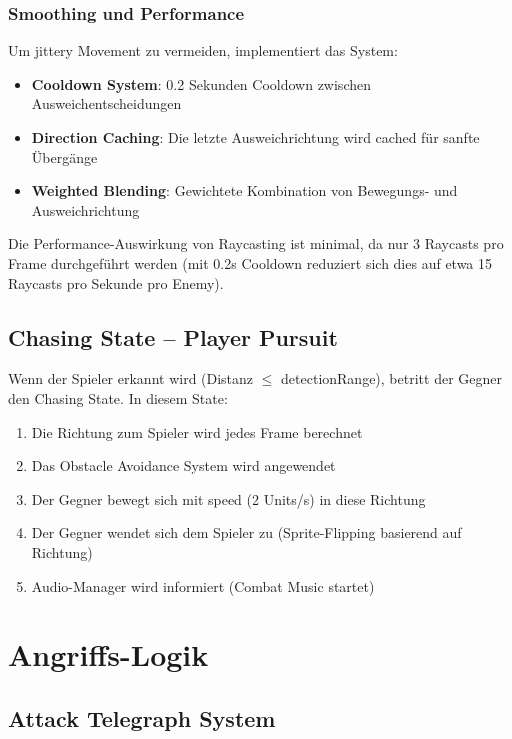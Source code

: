\documentclass[
  a4paper,
  11pt,
  ngerman,
  parskip=half,
  bibliography=totoc,
  listof=totoc
]{scrreprt}
\begin{document}
\subsubsection{Smoothing und Performance}

Um jittery Movement zu vermeiden, implementiert das System:

\begin{itemize}
    \item \textbf{Cooldown System}: 0.2 Sekunden Cooldown zwischen Ausweichentscheidungen
    \item \textbf{Direction Caching}: Die letzte Ausweichrichtung wird cached für sanfte Übergänge
    \item \textbf{Weighted Blending}: Gewichtete Kombination von Bewegungs- und Ausweichrichtung
\end{itemize}

Die Performance-Auswirkung von Raycasting ist minimal, da nur 3 Raycasts pro Frame durchgeführt werden (mit 0.2s Cooldown reduziert sich dies auf etwa 15 Raycasts pro Sekunde pro Enemy).

\subsection{Chasing State -- Player Pursuit}

Wenn der Spieler erkannt wird (Distanz $\leq$ detectionRange), betritt der Gegner den Chasing State. In diesem State:

\begin{enumerate}
    \item Die Richtung zum Spieler wird jedes Frame berechnet
    \item Das Obstacle Avoidance System wird angewendet
    \item Der Gegner bewegt sich mit speed (2 Units/s) in diese Richtung
    \item Der Gegner wendet sich dem Spieler zu (Sprite-Flipping basierend auf Richtung)
    \item Audio-Manager wird informiert (Combat Music startet)
\end{enumerate}

\section{Angriffs-Logik}

\subsection{Attack Telegraph System}
\end{document}
